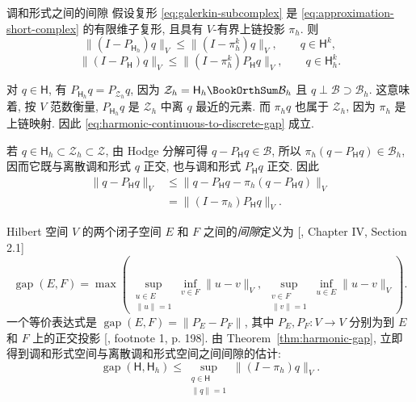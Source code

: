\begin{Theorem}{{调和形式之间的间隙}}\label{thm:harmonic-gap}
{假设复形 \eqref{eq:galerkin-subcomplex} 是 \eqref{eq:approximation-short-complex} 的有限维子复形, 且具有 $V$-有界上链投影 $\pi_h$. 则}
\begin{equation}\label{eq:harmonic-continuous-to-discrete-gap}
\|(I-P_{\mathsf H_h})q\|_V\leq\|(I-\pi_h^k)q\|_V,\qquad q\in\mathsf H^k,
\end{equation}
\begin{equation}\label{eq:harmonic-discrete-to-continuous-gap}
\|(I-P_{\mathsf H})q\|_V\leq\|(I-\pi_h^k)P_{\mathsf H}q\|_V,\qquad q\in\mathsf H_h^k.
\end{equation}
\end{Theorem}

\begin{Proof}
{对 $q\in\mathsf H$, 有 $P_{\mathsf H_h}q=P_{\mathcal Z_h}q$, 因为 $\mathcal Z_h=\mathsf H_h\BookOrthSum\mathcal B_h$ 且 $q\perp\mathcal B\supset\mathcal B_h$. 这意味着, 按 $V$ 范数衡量, $P_{\mathsf H_h}q$ 是 $\mathcal Z_h$ 中离 $q$ 最近的元素. 而 $\pi_hq$ 也属于 $\mathcal Z_h$, 因为 $\pi_h$ 是上链映射. 因此 \eqref{eq:harmonic-continuous-to-discrete-gap} 成立.}

{若 $q\in\mathsf H_h\subset\mathcal Z_h\subset\mathcal Z$, 由 Hodge 分解可得 $q-P_{\mathsf H}q\in\mathcal B$, 所以 $\pi_h(q-P_{\mathsf H}q)\in\mathcal B_h$, 因而它既与离散调和形式 $q$ 正交, 也与调和形式 $P_{\mathsf H}q$ 正交. 因此}
\[
\begin{aligned}
\|q-P_{\mathsf H}q\|_V&\leq\|q-P_{\mathsf H}q-\pi_h(q-P_{\mathsf H}q)\|_V\\
&=\|(I-\pi_h)P_{\mathsf H}q\|_V.
\end{aligned}
\]
\end{Proof}

{Hilbert 空间 $V$ 的两个闭子空间 $E$ 和 $F$ 之间的\emph{间隙}定义为 [, Chapter IV, Section 2.1]}
\begin{equation}\label{eq:subspace-gap-definition}
\operatorname{gap}(E,F)=\max\left(\sup_{\substack{u\in E\\\|u\|=1}}\inf_{v\in F}\|u-v\|_V,\ \sup_{\substack{v\in F\\\|v\|=1}}\inf_{u\in E}\|u-v\|_V\right).
\end{equation}
{一个等价表达式是 $\operatorname{gap}(E,F)=\|P_E-P_F\|$, 其中 $P_E,P_F:V\to V$ 分别为到 $E$ 和 $F$ 上的正交投影 [, footnote 1, p. 198]. 由 Theorem~\ref{thm:harmonic-gap}, 立即得到调和形式空间与离散调和形式空间之间间隙的估计:}
\[
\operatorname{gap}(\mathsf H,\mathsf H_h)\leq\sup_{\substack{q\in\mathsf H\\\|q\|=1}}\|(I-\pi_h)q\|_V.
\]

